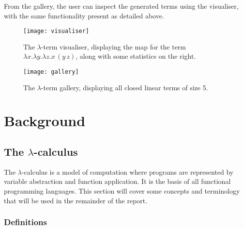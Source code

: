 \documentclass[11pt]{article}
\begin{document}
From the gallery, the user can inspect the generated terms using the visualiser, with the same functionality present as detailed above.

\begin{figure}
    \centering
    \texttt{[image: visualiser]}
    \caption{The $\lambda$-term visualiser, displaying the map for the term $\lambda x. \lambda y. \lambda z. x \, (y \, z)$, along with some statistics on the right.}
    \label{fig:visualiser}
\end{figure}

\begin{figure}
    \centering
    \texttt{[image: gallery]}
    \caption{The $\lambda$-term gallery, displaying all closed linear terms of size 5.}
    \label{fig:gallery}
\end{figure}

\newpage

\section{Background}
\label{sec:background}

\subsection{The \texorpdfstring{$\lambda$}{lambda}-calculus}
The $\lambda$-calculus is a model of computation where programs are represented by variable abstraction and function application. It is the basis of all functional programming languages. This section will cover some concepts and terminology that will be used in the remainder of the report.

\subsubsection{Definitions}
\label{sec:defs}
\end{document}
